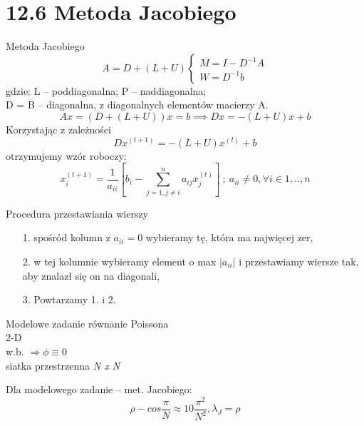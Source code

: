 \section{12.6 Metoda Jacobiego}

\begin{frame}{Metoda Jacobiego}
  $$
  A=D+(L+U)
  \begin{cases}
  M=I-D^{-1}A\\
  W=D^{-1}b
  \end{cases}
  $$
  gdzie: L -- poddiagonalna; P -- naddiagonalna;\\
  D = B -- diagonalna, z diagonalnych elementów macierzy A.
  $$Ax = (D+(L+U))x = b \implies Dx = -(L+U)x + b$$
  Korzystając z zależności
  $$\boxed{Dx^{(t+1)}= -(L+U)x^{(t)}+b}$$
  otrzymujemy wzór roboczy:
  $$x_i^{(t+1)}=\frac{1}{a_{ii}}[b_i-\sum_{j=1,j\neq i}^{n} a_{ij}x_j^{(t)}]\  ;\  a_{ii} \neq 0, \forall i \in {1,..,n} $$
\end{frame}

\begin{frame}
  \begin{block}{Procedura przestawiania wierszy}
    \begin{itemize}
      \item[1.] spośród kolumn z $a_{ii} = 0$ wybieramy tę, która ma najwięcej zer,
      \item[2.] w tej kolumnie wybieramy element o max $|a_{ii}|$ i przestawiamy wiersze tak, aby znalazł się on na diagonali,
      \item[3.] Powtarzamy 1. i 2.
    \end{itemize}
  \end{block}
\end{frame}

\begin{frame}{}
  \begin{block}{Modelowe zadanie}
    równanie Poissona
    \\2-D
    \\w.b. $\Rightarrow\phi\equiv 0$
    \\siatka przestrzenna \emph{N x N}
  \end{block}

  \begin{block}{Dla modelowego zadanie -- met. Jacobiego:}
    $$\rho - cos\frac{\pi}{N}\approx 1 0 \frac{\pi^2}{N^2}, \lambda _J = \rho$$
  \end{block}
\end{frame}

